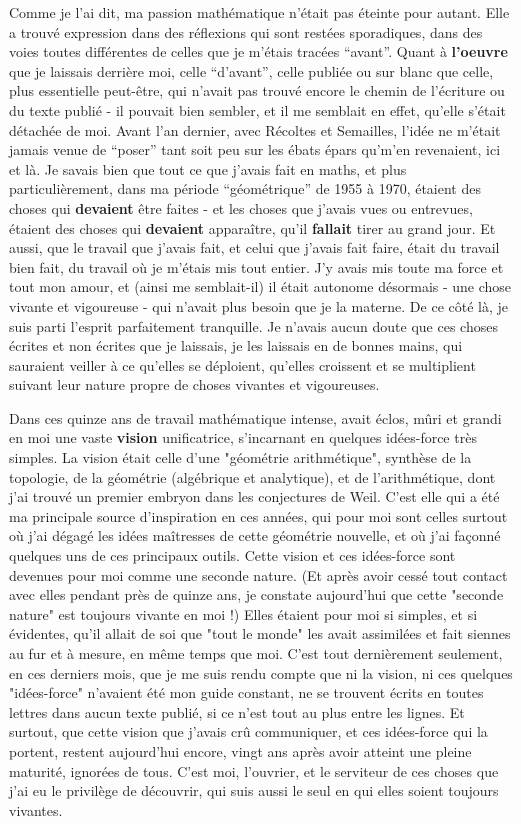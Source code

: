 Comme je l'ai dit, ma passion mathématique n'était pas éteinte pour autant. Elle a trouvé expression dans des réflexions qui sont restées sporadiques, dans des voies toutes différentes de celles que je m'étais tracées ``avant''. Quant à \textbf{l’oeuvre} que je laissais derrière moi, celle ``d'avant'', celle publiée ou sur blanc que celle, plus essentielle peut-être, qui n'avait pas trouvé encore le chemin de l'écriture ou du texte publié - il pouvait bien sembler, et il me semblait en effet, qu'elle s'était détachée de moi. Avant l'an dernier, avec Récoltes et Semailles, l'idée ne m'était jamais venue de ``poser'' tant soit peu sur les ébats épars qu'm'en revenaient, ici et là. Je savais bien que tout ce que j'avais fait en maths, et plus particulièrement, dans ma période ``géométrique'' de 1955 à 1970, étaient des choses qui \textbf{devaient} être faites - et les choses que j'avais vues ou entrevues, étaient des choses qui \textbf{devaient} apparaître, qu'il \textbf{fallait} tirer au grand jour. Et aussi, que le travail que j'avais fait, et celui que j'avais fait faire, était du travail bien fait, du travail où je m'étais mis tout entier. J'y avais mis toute ma force et tout mon amour, et (ainsi me semblait-il) il était autonome désormais - une chose vivante et vigoureuse - qui n'avait plus besoin que je la materne. De ce côté là, je suis parti l'esprit parfaitement tranquille. Je n'avais aucun doute que ces choses écrites et non écrites que je laissais, je les laissais en de bonnes mains, qui sauraient veiller à ce qu'elles se déploient, qu'elles croissent et se multiplient suivant leur nature propre de choses vivantes et vigoureuses.

Dans ces quinze ans de travail mathématique intense, avait éclos, mûri et grandi en moi une vaste \textbf{vision} unificatrice, s'incarnant en quelques idées-force très simples. La vision était celle d'une "géométrie arith\-métique", synthèse de la topologie, de la géométrie (algébrique et analytique), et de l'arithmétique, dont j'ai trouvé un premier embryon dans les conjectures de Weil. C'est elle qui a été ma principale source d'inspi\-ration en ces années, qui pour moi sont celles surtout où j'ai dégagé les idées maîtresses de cette géométrie nouvelle, et où j'ai façonné quelques uns de ces principaux outils. Cette vision et ces idées-force sont deve\-nues pour moi comme une seconde nature. (Et après avoir cessé tout contact avec elles pendant près de quinze ans, je constate aujourd'hui que cette "seconde nature" est toujours vivante en moi !) Elles étaient pour moi si simples, et si évidentes, qu'il allait de soi que "tout le monde" les avait assimilées et fait siennes au fur et à mesure, en même temps que moi. C'est tout dernièrement seulement, en ces derniers mois, que je me suis rendu compte que ni la vision, ni ces quelques "idées-force" n'avaient été mon guide constant, ne se trouvent écrits en toutes lettres dans aucun texte publié, si ce n'est tout au plus entre les lignes. Et surtout, que cette vision que j'avais crû communiquer, et ces idées-force qui la portent, restent aujourd'hui encore, vingt ans après avoir atteint une pleine maturité, ignorées de tous. C'est moi, l'ouvrier, et le serviteur de ces choses que j'ai eu le privilège de découvrir, qui suis aussi le seul en qui elles soient toujours vivantes.

